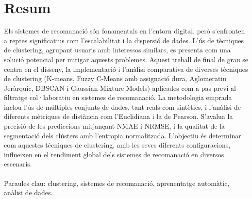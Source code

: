 \documentclass[a4paper,12pt]{report}
\begin{document}

\chapter*{Resum}
Els sistemes de recomanació són fonamentals en l'entorn digital, però s'enfronten a reptes significatius com l'escalabilitat i la dispersió de dades. L'ús de tècniques de clustering, agrupant usuaris amb interessos similars, es presenta com una solució potencial per mitigar aquests problemes. Aquest treball de final de grau se centra en el disseny, la implementació i l'anàlisi comparativa de diverses tècniques de clustering (K-means, Fuzzy C-Means amb assignació dura, Aglomeratiu Jeràrquic, DBSCAN i Gaussian Mixture Models) aplicades com a pas previ al filtratge col·laboratiu en sistemes de recomanació. La metodologia emprada inclou l'ús de múltiples conjunts de dades, tant reals com sintètics, i l'anàlisi de diferents mètriques de distància com l'Euclidiana i la de Pearson. S'avalua la precisió de les prediccions mitjançant NMAE i NRMSE, i la qualitat de la segmentació dels clústers amb l'entropia normalitzada. L'objectiu és determinar com aquestes tècniques de clustering, amb les seves diferents configuracions, influeixen en el rendiment global dels sistemes de recomanació en diversos escenaris.
\\
\\
Paraules clau: clustering, sistemes de recomanació, aprenentatge automàtic, anàlisi de dades.

\clearpage %

\end{document}
